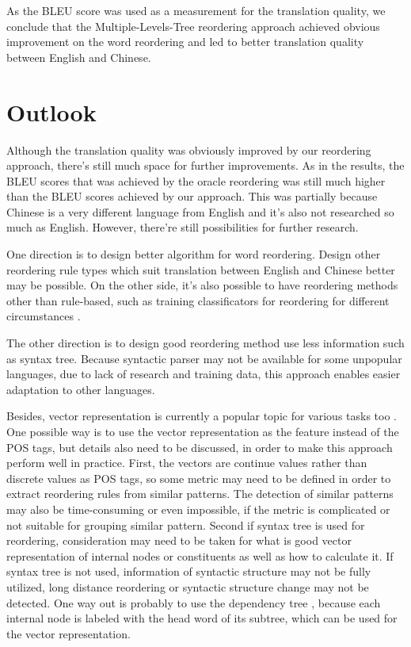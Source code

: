 As the BLEU score was used as a measurement for the translation quality, we conclude that the Multiple-Levels-Tree reordering approach achieved obvious improvement on the word reordering and led to better translation quality between English and Chinese.

\section{Outlook}
\label{ch:Discussion:sec:Outlook}

Although the translation quality was obviously improved by our reordering approach, there's still much space for further improvements. As in the results, the BLEU scores that was achieved by the oracle reordering was still much higher than the BLEU scores achieved by our approach. This was partially because Chinese is a very different language from English and it's also not researched so much as English. However, there're still possibilities for further research.

One direction is to design better algorithm for word reordering. Design other reordering rule types which suit translation between English and Chinese better may be possible. On the other side, it's also possible to have reordering methods other than rule-based, such as training classificators for reordering for different circumstances \citep{google}.

The other direction is to design good reordering method use less information such as syntax tree. Because syntactic parser may not be available for some unpopular languages, due to lack of research and training data, this approach enables easier adaptation to other languages.

Besides, vector representation is currently a popular topic for various tasks too \citep{oxford, Mikolov}. One possible way is to use the vector representation as the feature instead of the POS tags, but details also need to be discussed, in order to make this approach perform well in practice. First, the vectors are continue values rather than discrete values as POS tags, so some metric may need to be defined in order to extract reordering rules from similar patterns. The detection of similar patterns may also be time-consuming or even impossible, if the metric is complicated or not suitable for grouping similar pattern. Second if syntax tree is used for reordering, consideration may need to be taken for what is good vector representation of internal nodes or constituents as well as how to calculate it. If syntax tree is not used, information of syntactic structure may not be fully utilized, long distance reordering or syntactic structure change may not be detected. One way out is probably to use the dependency tree \citep{depend}, because each internal node is labeled with the head word of its subtree, which can be used for the vector representation. 

